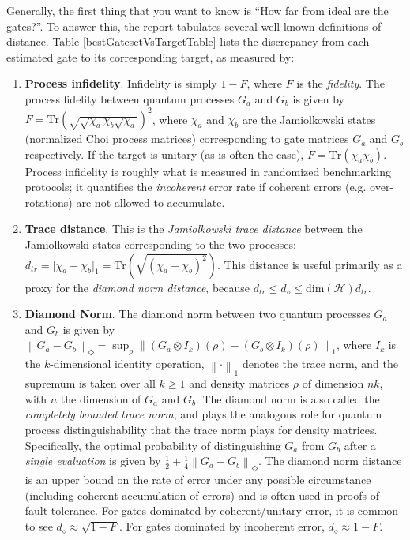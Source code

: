 \documentclass{article}[11pt]
\newcommand{\norm}[1]{\left\lVert#1\right\rVert}
\newcommand{\Tr}[0]{\mathrm{Tr}}
\begin{document}
Generally, the first thing that you want to know is ``How far from ideal are the gates?''.  To answer this, the report tabulates several well-known definitions of distance.  Table \ref{bestGatesetVsTargetTable} lists the discrepancy from each estimated gate to its corresponding target, as measured by:
\begin{enumerate}
\item \textbf{Process infidelity}.  Infidelity is simply $1-F$, where $F$ is the \emph{fidelity}.  The process fidelity between quantum processes $G_a$ and $G_b$ is given by $F = \Tr\left( \sqrt{ \sqrt{\chi_a} \chi_b \sqrt{\chi_a} } \right)^2$, where $\chi_a$ and $\chi_b$ are the Jamiolkowski states (normalized Choi process matrices) corresponding to gate matrices $G_a$ and $G_b$ respectively.  If the target is unitary (as is often the case), $F = \Tr\left( \chi_a \chi_b \right)$.  Process infidelity is roughly what is measured in randomized benchmarking protocols; it quantifies the \emph{incoherent} error rate if coherent errors (e.g. over-rotations) are not allowed to accumulate.
\item \textbf{Trace distance}.  This is the \emph{Jamiolkowski trace distance} between the Jamiolkowski states corresponding to the two processes:  $d_{tr} = \vert\chi_a - \chi_b\vert_1 = \Tr\left(\sqrt{(\chi_a-\chi_b)^2}\right)$.  This distance is useful primarily as a proxy for the \emph{diamond norm distance}, because $d_{tr} \leq d_{\diamond} \leq \mathrm{dim}(\mathcal{H}) d_{tr}$.
\item \textbf{Diamond Norm}.  The diamond norm between two quantum processes $G_a$ and $G_b$ is given by $\norm{G_a - G_b}_\Diamond = \sup_\rho \norm{(G_a \otimes I_k)(\rho) - (G_b \otimes I_k)(\rho)}_1$, where $I_k$ is the $k$-dimensional identity operation, $\norm{\cdot}_1$ denotes the trace norm, and the supremum is taken over all $k \ge 1$ and density matrices $\rho$ of dimension $nk$, with $n$ the dimension of $G_a$ and $G_b$.  The diamond norm is also called the \emph{completely bounded trace norm}, and plays the analogous role for quantum process distinguishability that the trace norm plays for density matrices.  Specifically, the optimal probability of distinguishing $G_a$ from $G_b$ after a \emph{single evaluation} is given by $\frac{1}{2} + \frac{1}{4}\norm{G_a - G_b}_\Diamond$.  The diamond norm distance is an upper bound on the rate of error under any possible circumstance (including coherent accumulation of errors) and is often used in proofs of fault tolerance.  For gates dominated by coherent/unitary error, it is common to see $d_{\diamond} \approx \sqrt{1-F}$.  For gates dominated by incoherent error, $d_{\diamond} \approx 1-F$.
\end{enumerate}
\end{document}
